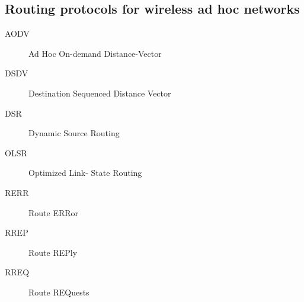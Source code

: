 \documentclass[twocolumn]{article}
\begin{document}
\begin{spacing}{0.5}
\subsection*{Routing protocols for wireless ad hoc networks}
\begin{description}
\item[AODV]Ad Hoc On-demand Distance-Vector
\item[DSDV]Destination Sequenced Distance Vector
\item[DSR]Dynamic Source Routing
\item[OLSR]Optimized Link- State Routing
\item[RERR]Route ERRor
\item[RREP]Route REPly
\item[RREQ]Route REQuests
\end{description}


\end{spacing}
\end{document}
